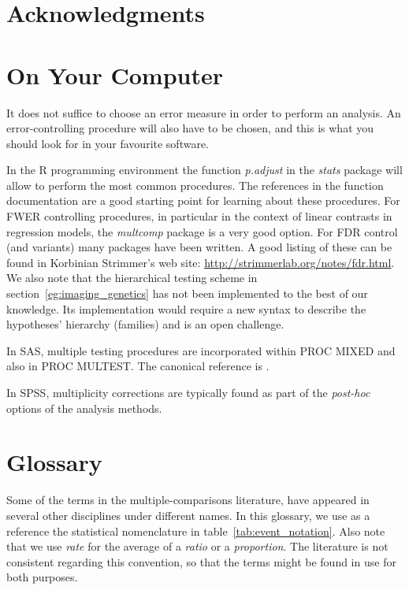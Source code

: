 \documentclass[review,12pt]{article}
\begin{document}
\section{Acknowledgments}



\appendix

\section{\label{sec:on_your_pc} On Your Computer}
It does not suffice to choose an error measure in order to perform an analysis. An error-controlling procedure will also have to be chosen, and this is what you should look for in your favourite software. 

In the R programming environment \citep{r_development_core_team_r:_2011} the function \emph{p.adjust} in the \emph{stats} package will allow to perform the most common procedures. The references in the function documentation are a good starting point for learning about these procedures. 
For FWER controlling procedures, in particular in the context of linear contrasts in regression models, the \emph{multcomp} package is a very good option. 
For FDR control (and variants) many packages have been written. A good listing of these can be found in Korbinian Strimmer's web site: \url{http://strimmerlab.org/notes/fdr.html}. 
We also note that the hierarchical testing scheme in section~\ref{eg:imaging_genetics} has not been implemented to the best of our knowledge. Its implementation would require a new syntax to describe the hypotheses' hierarchy (families) and is an open challenge. 

In SAS, multiple testing procedures are incorporated within PROC MIXED and also in PROC MULTEST.  The canonical reference is \citet{westfall_multiple_2011}. 

In SPSS, multiplicity corrections are typically found as part of the \emph{post-hoc} options of the analysis methods.



\section{\label{sec:glossary} Glossary}
Some of the terms in the multiple-comparisons literature, have appeared in several other disciplines under different names. In this glossary, we use as a reference the statistical nomenclature in table~\ref{tab:event_notation}. Also note that we use \emph{rate} for the average of a \emph{ratio} or a \emph{proportion}. The literature is not consistent regarding this convention, so that the terms might be found in use for both purposes.
\end{document}
